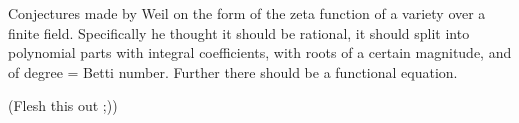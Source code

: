 \documentclass[12pt]{article}
\begin{document}
Conjectures made by Weil on the form of the zeta function of a variety over a finite field.  Specifically he thought it should be rational, it should split into polynomial parts with integral coefficients, with roots of a certain magnitude, and of degree = Betti number.  Further there should be a functional equation.

(Flesh this out ;))
\end{document}
